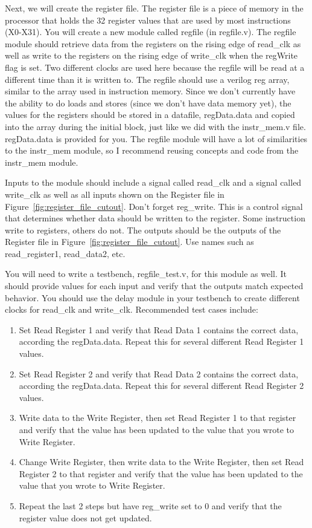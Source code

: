 Next, we will create the register file.  The register file is a piece of memory in the processor that holds the 32 register values that are used by most instructions (X0-X31).  You will create a new module called regfile (in regfile.v).  The regfile module should retrieve data from the registers on the rising edge of read\_clk as well as write to the registers on the rising edge of write\_clk when the regWrite flag is set.  Two different clocks are used here because the regfile will be read at a different time than it is written to.  The regfile should use a verilog reg array, similar to the array used in instruction memory.  Since we don't currently have the ability to do loads and stores (since we don't have data memory yet), the values for the registers should be stored in a datafile, regData.data and copied into the array during the initial block, just like we did with the instr\_mem.v file.  regData.data is provided for you.  The regfile module will have a lot of similarities to the instr\_mem module, so I recommend reusing concepts and code from the instr\_mem module.

Inputs to the module should include a signal called read\_clk and a signal called write\_clk as well as all inputs shown on the Register file in Figure~\ref{fig:register_file_cutout}.  Don't forget reg\_write.  This is a control signal that determines whether data should be written to the register.  Some instruction write to registers, others do not.  The outputs should be the outputs of the Register file in Figure~\ref{fig:register_file_cutout}.  Use names such as read\_register1, read\_data2, etc.

You will need to write a testbench, regfile\_test.v, for this module as well.  It should provide values for each input and verify that the outputs match expected behavior.  You should use the delay module in your testbench to create different clocks for read\_clk and write\_clk.  Recommended test cases include:

\begin{enumerate}
	\item Set Read Register 1 and verify that Read Data 1 contains the correct data, according the regData.data.  Repeat this for several different Read Register 1 values.
	\item Set Read Register 2 and verify that Read Data 2 contains the correct data, according the regData.data.  Repeat this for several different Read Register 2 values.
	\item Write data to the Write Register, then set Read Register 1 to that register and verify that the value has been updated to the value that you wrote to Write Register.
	\item Change Write Register, then write data to the Write Register, then set Read Register 2 to that register and verify that the value has been updated to the value that you wrote to Write Register.
	\item Repeat the last 2 steps but have reg\_write set to 0 and verify that the register value does not get updated.
\end{enumerate} 

